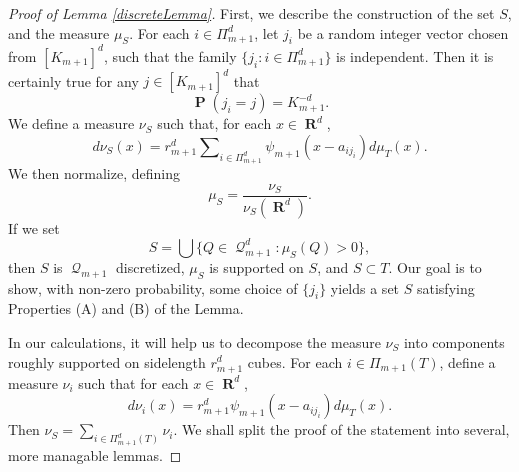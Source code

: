 \documentclass[12pt,reqno]{article}
\DeclareMathOperator{\RR}{\mathbf{R}}
\DeclareMathOperator{\PP}{\mathbf{P}}
\DeclareMathOperator{\DQ}{\mathcal{Q}}
\begin{document}
\begin{proof}[Proof of Lemma \ref{discreteLemma}]
    \renewcommand{\qedsymbol}{}
    First, we describe the construction of the set $S$, and the measure $\mu_S$. For each $i \in \Pi_{m+1}^d$, let $j_i$ be a random integer vector chosen from $[K_{m+1}]^d$, such that the family $\{ j_i : i \in \Pi_{m+1}^d \}$ is independent. Then it is certainly true for any $j \in [K_{m+1}]^d$ that
    \begin{equation} \label{equation129412904912090}
        \PP(j_i = j) = K_{m+1}^{-d}.
    \end{equation}
    We define a measure $\nu_S$ such that, for each $x \in \RR^d$,
    \[ d\nu_S(x) = r_{m+1}^d \sum\nolimits_{i \in \Pi_{m+1}^d} \psi_{m+1}(x - a_{ij_i}) d\mu_T(x). \]
    We then normalize, defining
    \[ \mu_S = \frac{\nu_S}{\nu_S(\RR^d)}. \]
    If we set
    \[ S = \bigcup \{ Q \in \DQ_{m+1}^d : \mu_S(Q) > 0 \}, \]
    then $S$ is $\DQ_{m+1}$ discretized, $\mu_S$ is supported on $S$, and $S \subset T$. Our goal is to show, with non-zero probability, some choice of $\{ j_i \}$ yields a set $S$ satisfying Properties (A) and (B) of the Lemma.

    In our calculations, it will help us to decompose the measure $\nu_S$ into components roughly supported on sidelength $r_{m+1}^d$ cubes. For each $i \in \Pi_{m+1}(T)$, define a measure $\nu_i$ such that for each $x \in \RR^d$,
    \[ d\nu_i(x) = r_{m+1}^d \psi_{m+1}(x - a_{ij_i}) d\mu_T(x). \]
    Then $\nu_S = \sum_{i \in \Pi_{m+1}^d(T)} \nu_i$. We shall split the proof of the statement into several, more managable lemmas.
\end{proof}
\end{document}
